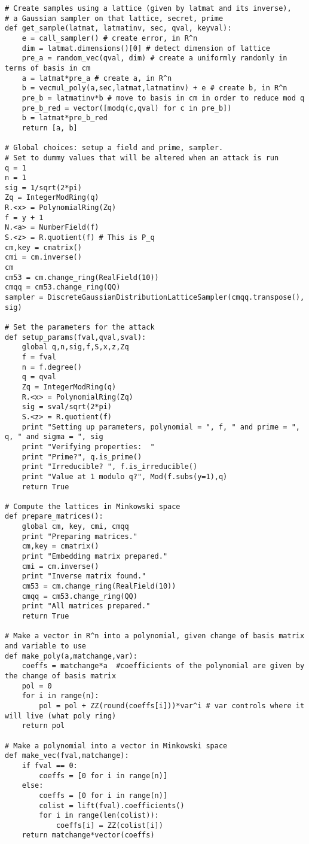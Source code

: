 \documentclass{llncs}
\newcommand{\<}{\langle}
\renewcommand{\>}{\rangle}
\begin{document}
\begin{verbatim}
# Create samples using a lattice (given by latmat and its inverse),
# a Gaussian sampler on that lattice, secret, prime
def get_sample(latmat, latmatinv, sec, qval, keyval):
    e = call_sampler() # create error, in R^n
    dim = latmat.dimensions()[0] # detect dimension of lattice
    pre_a = random_vec(qval, dim) # create a uniformly randomly in terms of basis in cm
    a = latmat*pre_a # create a, in R^n
    b = vecmul_poly(a,sec,latmat,latmatinv) + e # create b, in R^n
    pre_b = latmatinv*b # move to basis in cm in order to reduce mod q
    pre_b_red = vector([modq(c,qval) for c in pre_b])
    b = latmat*pre_b_red
    return [a, b]

# Global choices: setup a field and prime, sampler.
# Set to dummy values that will be altered when an attack is run
q = 1
n = 1
sig = 1/sqrt(2*pi)
Zq = IntegerModRing(q)
R.<x> = PolynomialRing(Zq)
f = y + 1
N.<a> = NumberField(f)
S.<z> = R.quotient(f) # This is P_q
cm,key = cmatrix()
cmi = cm.inverse()
cm
cm53 = cm.change_ring(RealField(10))
cmqq = cm53.change_ring(QQ)
sampler = DiscreteGaussianDistributionLatticeSampler(cmqq.transpose(), sig)

# Set the parameters for the attack
def setup_params(fval,qval,sval):
    global q,n,sig,f,S,x,z,Zq
    f = fval
    n = f.degree()
    q = qval
    Zq = IntegerModRing(q)
    R.<x> = PolynomialRing(Zq)
    sig = sval/sqrt(2*pi)
    S.<z> = R.quotient(f)
    print "Setting up parameters, polynomial = ", f, " and prime = ", q, " and sigma = ", sig
    print "Verifying properties:  "
    print "Prime?", q.is_prime()
    print "Irreducible? ", f.is_irreducible()
    print "Value at 1 modulo q?", Mod(f.subs(y=1),q)
    return True

# Compute the lattices in Minkowski space
def prepare_matrices():
    global cm, key, cmi, cmqq
    print "Preparing matrices."
    cm,key = cmatrix()
    print "Embedding matrix prepared."
    cmi = cm.inverse()
    print "Inverse matrix found."
    cm53 = cm.change_ring(RealField(10))
    cmqq = cm53.change_ring(QQ)
    print "All matrices prepared."
    return True

# Make a vector in R^n into a polynomial, given change of basis matrix and variable to use
def make_poly(a,matchange,var):
    coeffs = matchange*a  #coefficients of the polynomial are given by the change of basis matrix
    pol = 0
    for i in range(n):
        pol = pol + ZZ(round(coeffs[i]))*var^i # var controls where it will live (what poly ring)
    return pol

# Make a polynomial into a vector in Minkowski space
def make_vec(fval,matchange):
    if fval == 0:
        coeffs = [0 for i in range(n)]
    else:
        coeffs = [0 for i in range(n)]
        colist = lift(fval).coefficients()
        for i in range(len(colist)):
            coeffs[i] = ZZ(colist[i])
    return matchange*vector(coeffs)


\end{verbatim}
\end{document}
